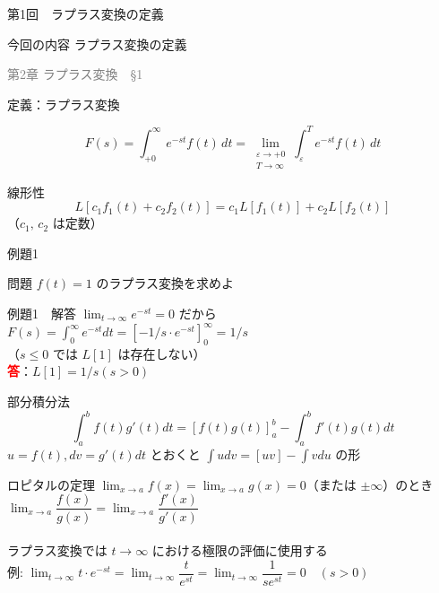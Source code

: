 \documentclass[professionalfonts]{beamer}
\begin{document}
\begin{frame}{第1回　ラプラス変換の定義}
  \begin{block}{今回の内容}
  ラプラス変換の定義
  \end{block}
  \vfill\hfill{\scriptsize \textcolor{gray}{第2章 ラプラス変換　§1}}
\end{frame}

\begin{frame}{定義：ラプラス変換}
  \begin{block}{}
  \[
    F(s) = \int_{+0}^{\infty} e^{-st} f(t)\,dt = \lim_{\substack{\varepsilon \to +0 \\ T \to \infty}} \int_{\varepsilon}^{T} e^{-st} f(t)\,dt
  \]
  \end{block}
\end{frame}

\begin{frame}{線形性}
  \[
    L[c_{1}f_{1}(t) + c_{2}f_{2}(t)] = c_{1}L[f_{1}(t)] + c_{2}L[f_{2}(t)]
  \]
  {\small （$c_1,\, c_2$ は定数）}
\end{frame}

\begin{frame}{例題1}
  \begin{exampleblock}{問題}
    $f(t) = 1$ のラプラス変換を求めよ\\[2pt]
  \end{exampleblock}
\end{frame}

\begin{frame}{例題1　解答}
  $\lim_{t \to \infty} e^{-st} = 0$ だから\\[4pt]
  $F(s) = \int_{0}^\infty e^{-st} dt = [-1/s \cdot e^{-st}]_{0}^\infty = 1/s$\\[4pt]
  （$s \leq 0$ では $L[1]$ は存在しない）
  \\[8pt]\textcolor{red}{\textbf{答}}：$L[1] = 1/s  (s > 0)$
\end{frame}

\begin{frame}{部分積分法}
  \[
    \int_a^b f(t)g'(t) dt = [f(t)g(t)]_a^b - \int_a^b f'(t)g(t) dt
  \]
  {\small $u = f(t), dv = g'(t)dt$ とおくと $\int u dv = [uv] - \int v du$ の形}
\end{frame}

\begin{frame}{ロピタルの定理}
  $\lim_{x\to a} f(x) = \lim_{x\to a} g(x) = 0$（または $\pm\infty$）のとき\\[2pt]
  $\lim_{x\to a} \dfrac{f(x)}{g(x)} = \lim_{x\to a} \dfrac{f'(x)}{g'(x)}$\\[2pt]
  \\[2pt]
  {\small ラプラス変換では $t \to \infty$ における極限の評価に使用する}\\[1pt]
  {\small 例: $\lim_{t\to\infty} t \cdot e^{-st} = \lim_{t\to\infty} \dfrac{t}{e^{st}} = \lim_{t\to\infty} \dfrac{1}{s e^{st}} = 0 \quad (s > 0)$}\\[1pt]
\end{frame}
\end{document}
